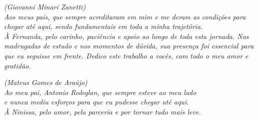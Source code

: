 \vspace*{5cm}
\begin{flushright}
\textit{
    (Giovanni Minari Zanetti)\\
    \vspace{0.5cm}
    Aos meus pais, que sempre acreditaram em mim e me deram as condições para chegar até aqui, sendo fundamentais em toda a minha trajetória. \\
    À Fernanda, pelo carinho, paciência e apoio ao longo de toda esta jornada. Nas madrugadas de estudo e nos momentos de dúvida, sua presença foi essencial para que eu seguisse em frente. Dedico este trabalho a vocês, com todo o meu amor e gratidão.
}
\end{flushright}

\newpage
\thispagestyle{empty}

\vspace*{5cm}
\begin{flushright}
\textit{
    (Mateus Gomes de Araújo)\\
    \vspace{0.5cm}
    Ao meu pai, Antonio Redeglan, que sempre esteve ao meu lado \\
    e nunca mediu esforços para que eu pudesse chegar até aqui. \\
    À Ninissa, pelo amor, pela parceria e por tornar tudo mais leve.
}
\end{flushright}